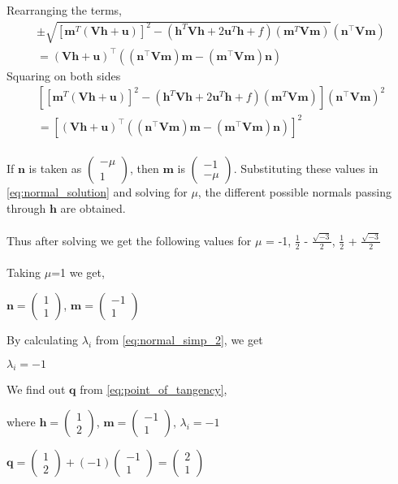 \documentclass[journal,10pt,twocolumn]{article}
\let\vec\mathbf
\newcommand{\myvec}[1]{\ensuremath{\begin{pmatrix}#1\end{pmatrix}}}
\providecommand{\brak}[1]{\ensuremath{\left(#1\right)}}
\providecommand{\sbrak}[1]{\ensuremath{{}\left[#1\right]}}
\begin{document}
Rearranging the terms,
{\tiny
\begin{multline}
	\pm \sqrt{\sbrak{\vec{m}^T\brak{\vec{V}\vec{h}+\vec{u}}}^2-\brak{\vec{h}^T\vec{V}\vec{h} + 2\vec{u}^T\vec{h} +f}\brak{\vec{m}^T\vec{V}\vec{m}}} \brak{\vec{n}^\top\vec{V}\vec{m}} \\ = \brak{\vec{Vh}+\vec{u}}^\top\brak{\brak{\vec{n}^\top\vec{V}\vec{m}}\vec{m}-\brak{\vec{m}^\top\vec{V}\vec{m}}\vec{n}}
\end{multline}
}
Squaring on both sides
{\tiny
\begin{multline}
	\sbrak{\sbrak{\vec{m}^T\brak{\vec{V}\vec{h}+\vec{u}}}^2-\brak{\vec{h}^T\vec{V}\vec{h} + 2\vec{u}^T\vec{h} +f}\brak{\vec{m}^T\vec{V}\vec{m}}}\brak{\vec{n}^\top\vec{V}\vec{m}}^2 \\ = \sbrak{\brak{\vec{Vh}+\vec{u}}^\top\brak{\brak{\vec{n}^\top\vec{V}\vec{m}}\vec{m}-\brak{\vec{m}^\top\vec{V}\vec{m}}\vec{n}}}^2
	\label{eq:normal_solution}
\end{multline}
}\\
If $\vec{n}$ is taken as $\myvec{-\mu \\ 1}$, then $\vec{m}$ is $\myvec{-1 \\ -\mu}$. Substituting these values in \eqref{eq:normal_solution} and solving for $\mu$, the different possible normals passing through $\vec{h}$ are obtained.\\\\
Thus after solving we get the following values for $\mu$ = {-1, $\frac{1}{2}$ - $\frac{\sqrt{-3}}{2}$, $\frac{1}{2}$ + $\frac{\sqrt{-3}}{2}$ }\\\\
Taking $\mu$=1 we get,
\begin{center}
$\vec{n} = \myvec{1 \\ 1}$, $\vec{m} = \myvec{-1 \\ 1}$\\
\end{center}
By calculating $\lambda_i$ from \eqref{eq:normal_simp_2}, we get
\begin{center}
    $\lambda_i = -1$
\end{center}
We find out $\vec{q}$ from \eqref{eq:point_of_tangency},
\begin{center}
where $\vec{h} = \myvec{1 \\ 2}$, $\vec{m} = \myvec{-1 \\ 1}$, $\lambda_i = -1$
\end{center}
\begin{center}
    $\vec{q} = \myvec{1 \\ 2} + (-1)\myvec{-1 \\ 1} = $\myvec{2 \\ 1}
\end{center}
\end{document}
